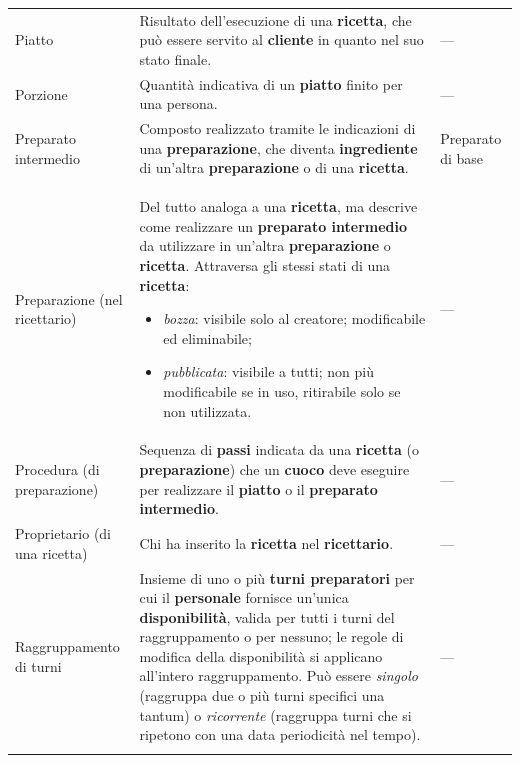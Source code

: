 \begin{longtable}{L{3.5cm} L{8.5cm} L{3cm}}
Piatto
& Risultato dell'esecuzione di una \textbf{ricetta}, che può essere servito al
  \textbf{cliente} in quanto nel suo stato finale.
& — \\
\addlinespace

Porzione
& Quantità indicativa di un \textbf{piatto} finito per una persona.
& — \\
\addlinespace

Preparato intermedio
& Composto realizzato tramite le indicazioni di una \textbf{preparazione}, che
  diventa \textbf{ingrediente} di un'altra \textbf{preparazione} o di una
  \textbf{ricetta}.
& Preparato di base \\
\addlinespace

Preparazione (nel ricettario)
& Del tutto analoga a una \textbf{ricetta}, ma descrive come realizzare un
  \textbf{preparato intermedio} da utilizzare in un'altra \textbf{preparazione}
  o \textbf{ricetta}. Attraversa gli stessi stati di una \textbf{ricetta}:
  \begin{itemize}[nosep,leftmargin=*]
    \item \emph{bozza}: visibile solo al creatore; modificabile ed
          eliminabile;
    \item \emph{pubblicata}: visibile a tutti; non più modificabile se in
          uso, ritirabile solo se non utilizzata.
  \end{itemize}
& — \\
\addlinespace

Procedura (di preparazione)
& Sequenza di \textbf{passi} indicata da una \textbf{ricetta} (o
  \textbf{preparazione}) che un \textbf{cuoco} deve eseguire per realizzare
  il \textbf{piatto} o il \textbf{preparato intermedio}.
& — \\
\addlinespace

Proprietario (di una ricetta)
& Chi ha inserito la \textbf{ricetta} nel \textbf{ricettario}.
& — \\
\addlinespace

Raggruppamento di turni
& Insieme di uno o più \textbf{turni preparatori} per cui il
  \textbf{personale} fornisce un'unica \textbf{disponibilità}, valida per
  tutti i turni del raggruppamento o per nessuno; le regole di modifica
  della disponibilità si applicano all'intero raggruppamento. Può essere
  \emph{singolo} (raggruppa due o più turni specifici una tantum) o \emph{ricorrente}
(raggruppa turni che si ripetono con una data periodicità nel tempo).
& — \\
\addlinespace


\end{longtable}
